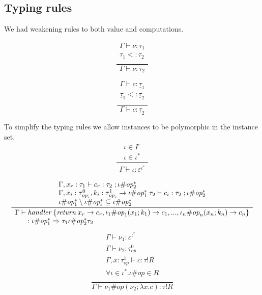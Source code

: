 \documentclass[12pt]{article}
\newcommand\eff[0]{\varepsilon}
\newcommand\eop[0]{\textit{op}}
\newcommand\allinsts[0]{I}
\newcommand\insts[1]{\allinsts^{#1}}
\newcommand\inst[0]{\iota}
\newcommand\type[0]{\tau}
\newcommand\tarre[3]{#1 \rightarrow #2 \; #3}
\newcommand\thandler[2]{#1 \Rightarrow #2}
\newcommand\tinst[2]{#1 ^{#2}}
\newcommand\ctype[0]{\underline{\type}}
\newcommand\cdirt[2]{#1 ! #2}
\newcommand\val[0]{\nu}
\newcommand\vhandler[1]{\textit{handler} \; \{#1\}}
\newcommand\comp[0]{c}
\newcommand\copi[5]{#1 \# #2(#3 ; \lambda #4 . #5)}
\begin{document}
\subsection{Typing rules}
We had weakening rules to both value and computations. \\
\begin{minipage}{0.5\textwidth}
\[\frac{
	\begin{array}{l}
	\Gamma \vdash \val : \type_1 \\
	\type_1 <: \type_2 \\
	\end{array}
}{
	\Gamma \vdash \val : \type_2
}\]
\end{minipage}
\begin{minipage}{0.5\textwidth}
\[\frac{
	\begin{array}{l}
	\Gamma \vdash \comp : \ctype_1 \\
	\ctype_1 <: \ctype_2 \\
	\end{array}
}{
	\Gamma \vdash \comp : \ctype_2
}\]
\end{minipage}

To simplify the typing rules we allow instances to be polymorphic in the instance set. \\
\[\frac{
	\begin{array}{l}
	\inst \in \insts{\eff} \\
	\inst \in \inst^*
	\end{array}
}{
	\begin{array}{l}
	\Gamma \vdash \inst : \tinst{\eff}{\inst^*}
	\end{array}
}\]

\[\frac{
	\begin{array}{l}
	\Gamma , x_r : \type_1 \vdash \comp_r : \type_2 \; ; \inst\#\eop^*_2 \\
	\Gamma , x_i : \type^0_{\eop_i} , k_i : \tarre{\type^1_{\eop_i}}{\inst\#\eop^*_1}{\type_2} \vdash \comp_i : \type_2 \; ; \inst\#\eop^*_2 \\
	\inst\#\eop^*_1 \setminus \inst\#\eop^*_i \subseteq \inst\#\eop^*_2 \\
	\end{array}
}{
	\begin{array}{l}
	\Gamma \vdash \vhandler{
		\textit{return} \; x_r \rightarrow \comp_r,
		\inst_1\#\eop_1 ( x_1 ; k_1 ) \rightarrow \comp_1,
		...,
		\inst_n\#\eop_n ( x_n ; k_n ) \rightarrow \comp_n
	} \\ \indent : \thandler{\inst\#\eop^*_1}{\type_1}{\inst\#\eop^*_2}{\type_2}
	\end{array}
}\]
\[\frac{
	\begin{array}{l}
	\Gamma \vdash \val_1 : \tinst{\eff}{\inst^*} \\
	\Gamma \vdash \val_2 : \type^0_\eop \\
	\Gamma , x : \type^1_\eop \vdash \comp : \cdirt{\type}{R} \\
	\forall \inst \in \inst^* . \inst\#\eop \in R \\
	\end{array}
}{
	\Gamma \vdash \copi{\val_1}{\eop}{\val_2}{x}{\comp} : \cdirt{\type}{R}
}\]
\end{document}
